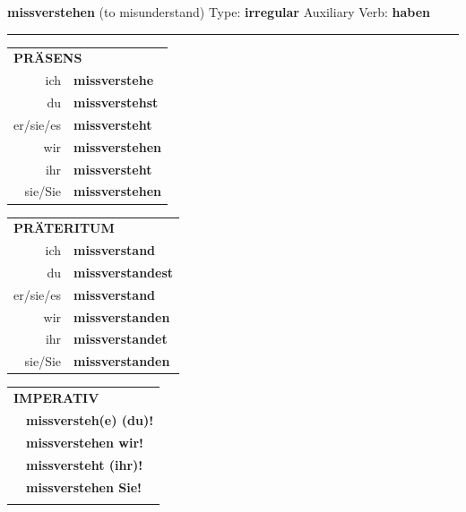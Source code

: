 \documentclass[10pt,a4paper]{revtex4-2}
\begin{document}
\begin{verbbox}
    {\Large \bf missverstehen} (to misunderstand) \hfill Type: \textbf{irregular} \hfill Auxiliary Verb: \textbf{haben} 
    
     \vspace{5pt}

    \hrule
    
    \vspace{5pt}

  \begin{tabular}{rl}
     \multicolumn{2}{l}{\textbf{PRÄSENS} }\\
    ich & \textbf{missverstehe}\\
    du & \textbf{missverstehst}\\
    er/sie/es & \textbf{missversteht}\\
    wir & \textbf{missverstehen}\\
    ihr & \textbf{missversteht}\\
    sie/Sie & \textbf{missverstehen}\\
  \end{tabular}
  \hfill
     \begin{tabular}{rl}
    \multicolumn{2}{l}{\textbf{PRÄTERITUM} }\\
    ich & \textbf{missverstand}\\
    du & \textbf{missverstandest}\\
    er/sie/es & \textbf{missverstand}\\
    wir & \textbf{missverstanden}\\
    ihr & \textbf{missverstandet}\\
    sie/Sie & \textbf{missverstanden}\\
  \end{tabular}
  \hfill
  \begin{tabular}{rl}
     \multicolumn{2}{l}{\textbf{IMPERATIV} }\\
   & \textbf{missversteh(e) (du)!}\\
   & \textbf{missverstehen wir!}\\
   & \textbf{missversteht (ihr)!}\\
   & \textbf{missverstehen Sie!}\\
   & \vspace{10pt}
  \end{tabular}

    \vspace{10pt}


\end{verbbox}
\end{document}
